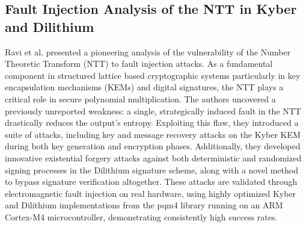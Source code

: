 \subsection*{Fault Injection Analysis of the NTT in Kyber and Dilithium}
Ravi et al. \cite{Ravi_Yang_Bhasin_Zhang_Chattopadhyay_2023} presented a pioneering analysis of the vulnerability of the Number Theoretic Transform (NTT) to fault injection attacks. As a fundamental component in structured lattice based cryptographic systems particularly in key encapsulation mechanisms (KEMs) and digital signatures, the NTT plays a critical role in secure polynomial multiplication. The authors uncovered a previously unreported weakness: a single, strategically induced fault in the NTT drastically reduces the output’s entropy. Exploiting this flaw, they introduced a suite of attacks, including key and message recovery attacks on the Kyber KEM during both key generation and encryption phases. Additionally, they developed innovative existential forgery attacks against both deterministic and randomized signing processes in the Dilithium signature scheme, along with a novel method to bypass signature verification altogether. These attacks are validated through electromagnetic fault injection on real hardware, using highly optimized Kyber and Dilithium implementations from the pqm4 library running on an ARM Cortex-M4 microcontroller, demonstrating consistently high success rates.